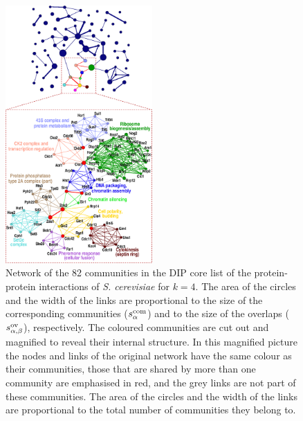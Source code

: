 \documentclass[11pt,a4paper]{article}
\begin{document}
\begin{figure}[!t]
\centerline{\includegraphics[width=0.5\textwidth]{vegso/dip_abra}}
\caption{
Network of the 82 communities in the DIP core list of the
protein-protein interactions of \textit{S. cerevisiae} for $k=4$.
The
area of the circles and the width of the links are proportional to the
size of the corresponding communities ($s^{\rm com}_\alpha$) and to the
size of the overlaps ($s^{\rm ov}_{\alpha,\beta}$), respectively. The
coloured communities are cut out and magnified to reveal their internal
structure. In this magnified picture the nodes and links of the
original network have the same colour as their communities, those that
are shared by more than one community are emphasised in red, and the
grey links are not part of these communities. The area of the circles
and the width of the links are proportional to the total number of
communities they belong to.
}
\label{fig:prot-comm}
\end{figure}
\end{document}

